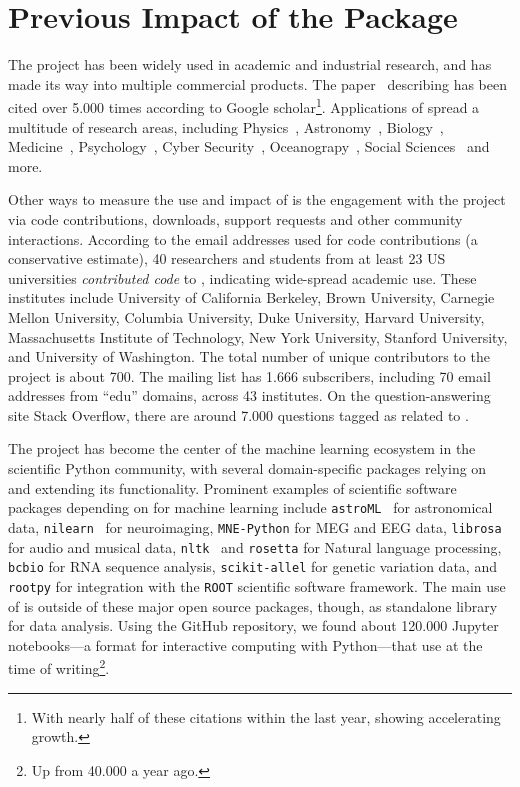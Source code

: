 \section{Previous Impact of the \sklearn{} Package}
The \sklearn{} project has been widely used in academic and industrial research,
and has made its way into multiple commercial products. The
paper~\autocite{pedregosa2011scikit} describing \sklearn{} has been cited over 5.000 times
according to Google scholar\footnote{With nearly half of these citations
within the last year, showing accelerating growth.}.
Applications of \sklearn{} spread a multitude of research areas, including
Physics~\autocite{Baldi:2016fql, Yang:2016nnd},
Astronomy~\autocite{pereira2013spectrophotometric, bennett20141},
Biology~\autocite{misof2014phylogenomics, ritchie2014functional},
Medicine~\autocite{kamalov2015improving, ng2015computer},
Psychology~\autocite{park2015automatic,doehrmann2013predicting}, Cyber
Security~\autocite{sahs2012machine},
Oceanograpy~\autocite{sunagawa2015structure}, Social
Sciences~\autocite{driscoll2015searching, croicu2015improving} and more.

Other ways to measure the use and impact of \sklearn{} is the engagement with
the project via code contributions, downloads, support requests and other
community interactions.
According to the email addresses used for code contributions (a conservative
estimate), 40 researchers and students from at least 23 US universities
\emph{contributed code} to \sklearn{}, indicating wide-spread academic use.
These institutes include University of California Berkeley, Brown University,
Carnegie Mellon University, Columbia University, Duke University, Harvard
University, Massachusetts Institute of Technology, New York University,
Stanford University, and University of Washington.
The total number of unique contributors to the project is about 700.
%
The \sklearn{} mailing list has 1.666 subscribers, including 70 email
addresses from ``edu'' domains, across 43 institutes.
%
On the question-answering site Stack Overflow, there are around 7.000 questions
tagged as related to \sklearn{}.

The \sklearn{} project has become the center of the machine learning ecosystem
in the scientific Python community, with several domain-specific packages
relying on and extending its functionality.
Prominent examples of scientific software packages depending on \sklearn{}
for machine learning include \texttt{astroML}~\autocite{van2013openml} for astronomical
data, \texttt{nilearn}~\autocite{abraham2014machine} for neuroimaging, \texttt{MNE-Python} for MEG
and EEG data, \texttt{librosa}~\autocite{mcfee2015librosa} for audio and musical data,
\texttt{nltk}~\autocite{bird2006nltk} and \texttt{rosetta} for Natural language processing, \texttt{bcbio} for
RNA sequence analysis, \texttt{scikit-allel} for genetic variation data, and \texttt{rootpy} for
integration with the \texttt{ROOT} scientific software framework.
The main use of \sklearn{} is outside of these major open source packages, though,
as standalone library for data analysis. Using the GitHub repository, we found
about 120.000 Jupyter notebooks---a format for interactive computing with
Python---that use \sklearn{} at the time of writing\footnote{Up from 40.000 a year ago.}.

